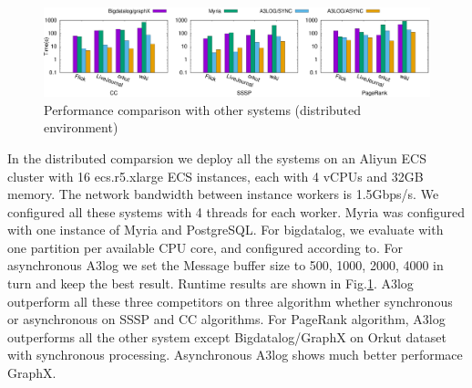 \begin{figure}[!t]
	\vspace{1in}
	\centering
	\includegraphics[width=6.6in]{figuration/compare.eps}
	\vspace{-0.1in}
	\caption{Performance comparison with other systems (distributed environment)}
	\label{fig:dist-result}
\end{figure}
In the distributed comparsion we deploy all the systems on an Aliyun ECS cluster with
16 ecs.r5.xlarge ECS instances, each with 4 vCPUs and 32GB memory. The network bandwidth between instance workers is  1.5Gbps/s. We configured all these systems with 4 threads for each worker. Myria was configured with one instance of Myria and PostgreSQL. For bigdatalog, we evaluate with one partition per available CPU core, and configured according to\cite{Shkapsky:2016:BDA:2882903.2915229}. For asynchronous A3log we set the Message buffer size to 500, 1000, 2000, 4000 in turn and keep the best result. Runtime results are shown in Fig.\ref{fig:dist-result}. A3log outperform all these three competitors on three algorithm whether synchronous or asynchronous on SSSP and CC algorithms.
For PageRank algorithm, A3log outperforms all the other system except Bigdatalog/GraphX on Orkut dataset with synchronous processing. Asynchronous A3log shows much better performace GraphX.


